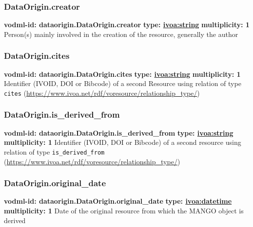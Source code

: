     \subsubsection{DataOrigin.creator}
      \textbf{vodml-id: dataorigin.DataOrigin.creator} \newline
      \textbf{type: \hyperref[sect:ivoa]{ivoa:string}} \newline
      \textbf{multiplicity: 1} \newline
      Person(s) mainly involved in the creation of the resource, generally the author

    \subsubsection{DataOrigin.cites}
      \textbf{vodml-id: dataorigin.DataOrigin.cites} \newline
      \textbf{type: \hyperref[sect:ivoa]{ivoa:string}} \newline
      \textbf{multiplicity: 1} \newline
      Identifier (IVOID, DOI or Bibcode) of a second Resource using relation of type \texttt{cites} (\url{https://www.ivoa.net/rdf/voresource/relationship\_type/})

    \subsubsection{DataOrigin.is\_derived\_from}
      \textbf{vodml-id: dataorigin.DataOrigin.is\_derived\_from} \newline
      \textbf{type: \hyperref[sect:ivoa]{ivoa:string}} \newline
      \textbf{multiplicity: 1} \newline
      Identifier (IVOID, DOI or Bibcode) of a second resource using relation of type \texttt{is\_derived\_from} (\url{https://www.ivoa.net/rdf/voresource/relationship\_type/})

    \subsubsection{DataOrigin.original\_date}
      \textbf{vodml-id: dataorigin.DataOrigin.original\_date} \newline
      \textbf{type: \hyperref[sect:ivoa]{ivoa:datetime}} \newline
      \textbf{multiplicity: 1} \newline
      Date of the original resource from which the MANGO object is derived

